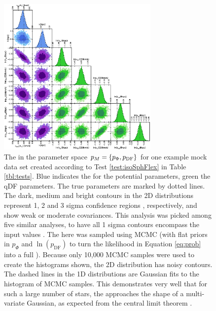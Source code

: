 



\begin{figure}
\centering
\includegraphics[width=0.7\textwidth]{figs/isoSphFlex_short_hot_2kpc_triangle_MCMC.eps}
\caption{The \pdf{} in the parameter space $p_M{} = \{p_\Phi,p_\text{DF}\}$ for one example mock data set created according to Test \ref{test:isoSphFlex} in Table \ref{tbl:tests}. Blue indicates the \pdf{} for the potential parameters, green the qDF parameters. The true parameters are marked by dotted lines. The dark, medium and bright contours in the 2D distributions represent 1, 2 and 3 sigma confidence regions , respectively, and show weak or moderate covariances. This analysis was picked among five similar analyses, to have all 1 sigma contours encompass the input values . The \pdf{} here was sampled using MCMC (with flat priors in $p_\Phi$ and  $\ln(p_\text{DF})$ to turn the likelihood in Equation \ref{eq:prob} into a full \pdf{}). Because only 10,000 MCMC samples were used to create the histograms shown, the 2D distribution has noisy contours. The dashed lines in the 1D distributions are Gaussian fits to the histogram of MCMC samples. This demonstrates very well that for such a large number of stars, the \pdf{} approaches the shape of a multi-variate Gaussian, as expected from the central limit theorem . }
\label{fig:isoSphFlex_triangleplot}
\end{figure}

